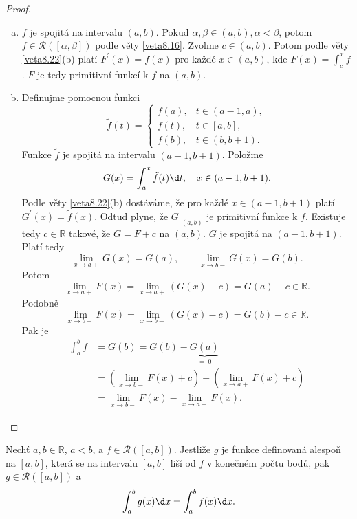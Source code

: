 \begin{proof}
	\,
	\begin{enumerate}[(a)]
		\item $f$ je spojitá na intervalu $(a,b)$. Pokud $\alpha, \beta \in (a,b), \alpha < \beta$,
		potom $f \in \mathcal R([\alpha,\beta])$ podle věty \ref{veta8.16}. Zvolme $c \in (a,b)$. Potom
		podle věty \ref{veta8.22}(b) platí $F^\prime(x) = f(x)$ pro každé $x \in (a,b)$, kde $F(x) = \int_c^x f$.
		$F$ je tedy primitivní funkcí k $f$ na $(a,b)$.
		\item Definujme pomocnou funkci
		$$
		    \tilde{f}(t) = \begin{cases}
							f(a), & t \in (a-1,a),\\
							f(t), & t \in [a,b], \\
							f(b), & t\in (b,b+1).
						\end{cases}
		$$
		Funkce $\tilde f$ je spojitá na intervalu $(a-1,b+1)$. Položme
		$$
		    G(x) = \int_a^x \tilde f(t) \d t, \quad x \in (a-1,b+1).
		$$
		Podle věty \ref{veta8.22}(b) dostáváme, že pro každé
		$
		    x \in (a-1,b+1)
		$
		platí $G^\prime(x) = \tilde f(x)$. Odtud plyne, že $G |_{(a,b)}$ je primitivní funkce k $f$.
		Existuje tedy $c \in \mathbb R $ takové, že $G = F+c$ na $(a,b)$. $G$ je spojitá na
		$(a-1,b+1)$. Platí tedy
		$$
  \lim_{x\to a+} G(x)=G(a), \qquad \lim_{x\to b-} G(x) = G(b).
		$$
		Potom $$\lim_{x\to a+} F(x) = \lim_{x\to a+} (G(x)-c)=G(a)-c\in \mathbb R .$$
	    Podobně
		$$
		    \lim_{x\to b-} F(x) = \lim_{x\to b-} (G(x)-c)=G(b)-c\in \mathbb R .
		$$
		Pak je
		\begin{align*}
		\int_a^b f &= G(b)=G(b)-\underbrace{G(a)}_{=\ 0}\\
	& = \left (\lim_{x\to b-} F(x)+ c\right ) - \left (\lim_{x\to a+} F(x)+c \right) \\
	&= \lim_{x\to b-} F(x) - \lim_{x\to a+} F(x).
\end{align*}\qedhere
	\end{enumerate}
\end{proof}

\begin{veta}\label{veta8.24}
Nechť $a,b \in \mathbb{R}$, $a<b$, a $f \in \mathcal R([a,b])$. Jestliže $g$ je funkce definovaná alespoň
na $[a,b]$, která se na intervalu $[a,b]$ liší od $f$ v konečném počtu bodů, pak $g \in \mathcal R([a,b])$ a
\[
\int_a^b g(x)\d x = \int_a^b f(x)\d x.
\]
\end{veta}

